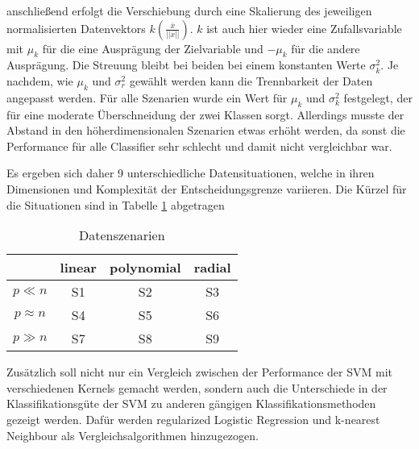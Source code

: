 \documentclass[
]{article}
\begin{document}
anschließend erfolgt die Verschiebung durch eine Skalierung des
jeweiligen normalisierten Datenvektors
\(k\left(\frac{\overline{x}}{||x||}\right)\). \(k\) ist auch hier wieder
eine Zufallsvariable mit \(\mu_k\) für die eine Ausprägung der
Zielvariable und \(-\mu_k\) für die andere Ausprägung. Die Streuung
bleibt bei beiden bei einem konstanten Werte \(\sigma^2_k\). Je nachdem,
wie \(\mu_k\) und \(\sigma^2_r\) gewählt werden kann die Trennbarkeit
der Daten angepasst werden. Für alle Szenarien wurde ein Wert für
\(\mu_k\) und \(\sigma^2_k\) festgelegt, der für eine moderate
Überschneidung der zwei Klassen sorgt. Allerdings musste der Abstand in
den höherdimensionalen Szenarien etwas erhöht werden, da sonst die
Performance für alle Classifier sehr schlecht und damit nicht
vergleichbar war.

Es ergeben sich daher 9 unterschiedliche Datensituationen, welche in
ihren Dimensionen und Komplexität der Entscheidungsgrenze variieren. Die
Kürzel für die Situationen sind in Tabelle \ref{tab:datensituationen}
abgetragen

\begin{table}[H]
\begin{center}
\begin{tabular}{ |c|c|c|c| }
 \hline
  & linear & polynomial & radial \\
 \hline
 $p \ll n$ & S1 & S2 & S3 \\
 \hline
 $p \approx n$ & S4 & S5 & S6 \\
 \hline
 $p \gg n$ & S7 & S8 & S9 \\
 \hline
\end{tabular}
\end{center}
\caption{Datenszenarien}
\label{tab:datensituationen}
\end{table}

Zusätzlich soll nicht nur ein Vergleich zwischen der Performance der SVM
mit verschiedenen Kernels gemacht werden, sondern auch die Unterschiede
in der Klassifikationsgüte der SVM zu anderen gängigen
Klassifikationsmethoden gezeigt werden. Dafür werden regularized
Logistic Regression und k-nearest Neighbour als Vergleichsalgorithmen
hinzugezogen.

\printbibliography
\end{document}
